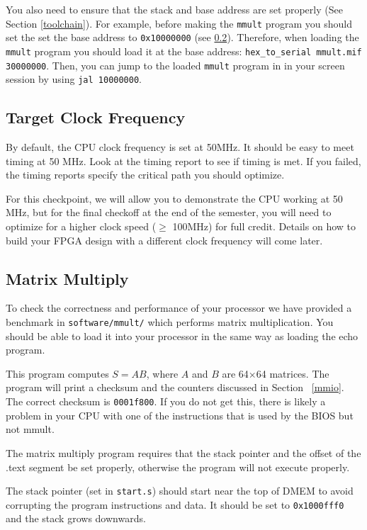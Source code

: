 \documentclass[11pt]{article}
\begin{document}
You also need to ensure that the stack and base address are set properly (See Section \ref{toolchain}).
For example, before making the \verb|mmult| program you should set the set the base address to \verb|0x10000000| (see \ref{mmult}).
Therefore, when loading the \verb|mmult| program you should load it at the base address: \verb|hex_to_serial mmult.mif 30000000|.
Then, you can jump to the loaded \verb|mmult| program in in your screen session by using \verb|jal 10000000|.

\subsection{Target Clock Frequency}
By default, the CPU clock frequency is set at 50MHz.
It should be easy to meet timing at 50 MHz.
Look at the timing report to see if timing is met.
If you failed, the timing reports specify the critical path you should optimize.

For this checkpoint, we will allow you to demonstrate the CPU working at 50 MHz, but for the final checkoff at the end of the semester, you will need to optimize for a higher clock speed ($\geq$ 100MHz) for full credit.
Details on how to build your FPGA design with a different clock frequency will come later.

\subsection{Matrix Multiply}
\label{mmult}
To check the correctness and performance of your processor we have provided a benchmark in \verb|software/mmult/| which performs matrix multiplication.
You should be able to load it into your processor in the same way as loading the echo program.

This program computes $S=AB$, where $A$ and $B$ are 64$\times$64 matrices.
The program will print a checksum and the counters discussed in Section ~\ref{mmio}.
The correct checksum is \verb|0001f800|.
If you do not get this, there is likely a problem in your CPU with one of the instructions that is used by the BIOS but not mmult.

The matrix multiply program requires that the stack pointer and the offset of the .text segment be set properly, otherwise the program will not execute properly.

The stack pointer (set in \verb|start.s|) should start near the top of DMEM to avoid corrupting the program instructions and data.
It should be set to \verb|0x1000fff0| and the stack grows downwards.
\end{document}
